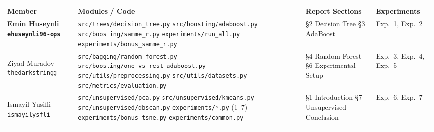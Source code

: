 \documentclass[11pt,a4paper]{article}
\begin{document}
\renewcommand{\arraystretch}{1.4}
\begin{longtable}{>{\bfseries}p{3.5cm} p{5cm} p{3.2cm} p{2.8cm}}
\toprule
Member & Modules / Code & Report Sections & Experiments \\
\midrule
\endhead

Emin Huseynli\newline
{\normalfont\small\texttt{ehuseynli96-ops}} &
\texttt{src/trees/decision\_tree.py}\newline
\texttt{src/boosting/adaboost.py}\newline
\texttt{src/boosting/samme\_r.py}\newline
\texttt{experiments/run\_all.py}\newline
\texttt{experiments/bonus\_samme\_r.py} &
\S2 Decision Tree\newline
\S3 AdaBoost &
Exp.\ 1, Exp.\ 2 \\

\midrule

Ziyad Muradov\newline
{\normalfont\small\texttt{thedarkstringg}} &
\texttt{src/bagging/random\_forest.py}\newline
\texttt{src/boosting/one\_vs\_rest\_adaboost.py}\newline
\texttt{src/utils/preprocessing.py}\newline
\texttt{src/utils/datasets.py}\newline
\texttt{src/metrics/evaluation.py} &
\S4 Random Forest\newline
\S6 Experimental Setup &
Exp.\ 3, Exp.\ 4, Exp.\ 5 \\

\midrule

Ismayil Yusifli\newline
{\normalfont\small\texttt{ismayilysfli}} &
\texttt{src/unsupervised/pca.py}\newline
\texttt{src/unsupervised/kmeans.py}\newline
\texttt{src/unsupervised/dbscan.py}\newline
\texttt{experiments/*.py} (1--7)\newline
\texttt{experiments/bonus\_tsne.py}\newline
\texttt{experiments/common.py} &
\S1 Introduction\newline
\S7 Unsupervised\newline
Conclusion &
Exp.\ 6, Exp.\ 7 \\

\bottomrule
\end{longtable}
\end{document}
